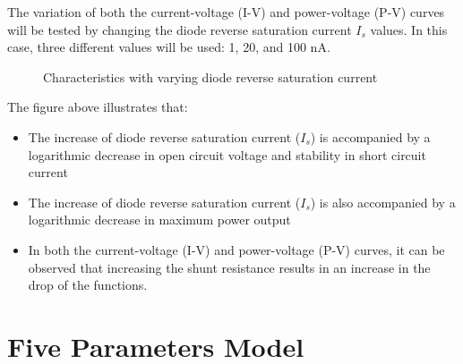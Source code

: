 \documentclass{report}
\begin{document}
The variation of both the current-voltage (I-V) and power-voltage (P-V) curves will be tested by changing the diode reverse saturation current $I_{s}$ values. In this case, three different values will be used: 1, 20, and 100 nA.

\begin{figure}[h!]
  \centering
  \hfill
  \caption{Characteristics with varying diode reverse saturation current}
\end{figure}

\newpage
\hfill \break
The figure above illustrates that:
\begin{itemize}
    \item The increase of diode reverse saturation current ($I_{s}$) is accompanied by a logarithmic decrease in open circuit voltage and stability in short circuit current 
    \item The increase of diode reverse saturation current ($I_{s}$) is also accompanied by a logarithmic decrease in maximum power output
    \item In both the current-voltage (I-V) and power-voltage (P-V) curves, it can be observed that increasing the shunt resistance results in an increase in the drop of the functions.
\end{itemize}


\section{Five Parameters Model}
\end{document}
